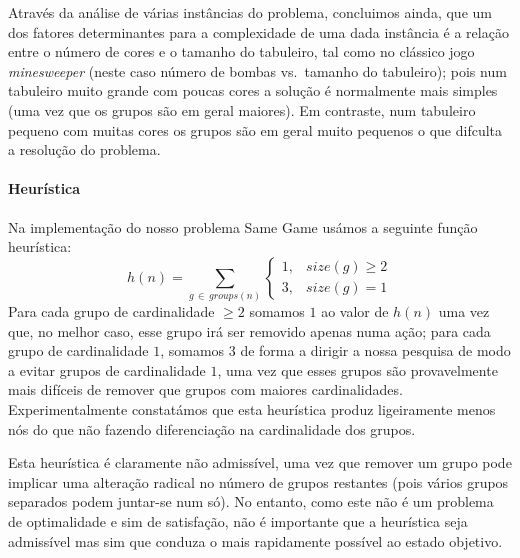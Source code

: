 \documentclass[a4paper]{article}
\begin{document}
    Através da análise de várias instâncias do problema, concluimos ainda, que um dos fatores determinantes para a complexidade
    de uma dada instância é a relação entre o número de cores e o tamanho do tabuleiro, tal como no clássico jogo \textit{minesweeper}
    (neste caso número de bombas vs.\ tamanho do tabuleiro); pois num tabuleiro muito grande com poucas cores a solução é normalmente
    mais simples (uma vez que os grupos são em geral maiores). Em contraste, num tabuleiro pequeno com muitas cores os
    grupos são em geral muito pequenos o que difculta a resolução do problema.


    \paragraph{Heurística}
    Na implementação do nosso problema Same Game usámos a seguinte função heurística:
    \[
        h(n) = \sum_{g\, \in\, groups(n)}
        \begin{cases}
            1, & size(g) \geq 2 \\
            3, & size(g) = 1
        \end{cases}
    \]
    Para cada grupo de cardinalidade $\geq 2$ somamos $1$ ao valor de $h(n)$ uma vez que, no melhor caso, esse grupo irá ser removido
    apenas numa ação; para cada grupo de cardinalidade $1$, somamos $3$ de forma a dirigir a nossa pesquisa de modo a evitar
    grupos de cardinalidade $1$, uma vez que esses grupos são provavelmente mais difíceis de remover que grupos com maiores cardinalidades.
    Experimentalmente constatámos que esta heurística produz ligeiramente menos nós do que não fazendo diferenciação na
    cardinalidade dos grupos.

    Esta heurística é claramente não admissível, uma vez que remover um grupo pode implicar uma alteração radical no número
    de grupos restantes (pois vários grupos separados podem juntar-se num só). No entanto, como este não é um problema de
    optimalidade e sim de satisfação, não é importante que a heurística seja admissível mas sim que conduza o mais rapidamente
    possível ao estado objetivo.
\end{document}
